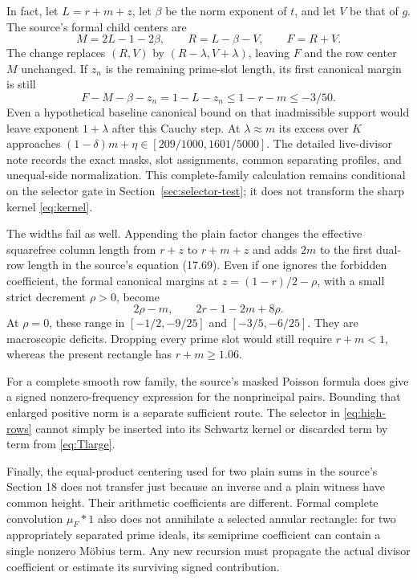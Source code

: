\documentclass[11pt]{article}
\theoremstyle{definition}
\theoremstyle{remark}
\numberwithin{equation}{section}
\begin{document}
In fact, let $L=r+m+z$, let $\beta$ be the norm exponent of $t$,
and let $V$ be that of $g$. The source's formal child centers are
\[
M=2L-1-2\beta,\qquad R=L-\beta-V,\qquad F=R+V.
\]
The change replaces $(R,V)$ by $(R-\lambda,V+\lambda)$, leaving
$F$ and the row center $M$ unchanged. If $z_n$ is the remaining
prime-slot length, its first canonical margin is still
\begin{equation}\label{eq:live-width}
F-M-\beta-z_n=1-L-z_n\le1-r-m\le-3/50.
\end{equation}
Even a hypothetical baseline canonical bound on that inadmissible
support would leave exponent $1+\lambda$ after this Cauchy step.
At $\lambda\approx m$ its excess over $K$ approaches
$(1-\delta)m+\eta\in[209/1000,1601/5000]$.
The detailed live-divisor note records the exact masks, slot assignments,
common separating profiles, and unequal-side normalization. This
complete-family calculation remains conditional on the selector gate
in Section~\ref{sec:selector-test}; it does not transform the sharp
kernel \eqref{eq:kernel}.

The widths fail as well. Appending the plain factor changes the
effective squarefree column length from $r+z$ to $r+m+z$ and adds
$2m$ to the first dual-row length in the source's equation (17.69).
Even if one ignores the forbidden coefficient, the formal canonical
margins at $z=(1-r)/2-\rho$, with a small strict decrement $\rho>0$,
become
\begin{equation}\label{eq:bad-widths}
2\rho-m,\qquad 2r-1-2m+8\rho.
\end{equation}
At $\rho=0$, these range in $[-1/2,-9/25]$ and
$[-3/5,-6/25]$. They are macroscopic deficits. Dropping every
prime slot would still require $r+m<1$, whereas the present rectangle
has $r+m\ge1.06$.

For a complete smooth row family, the source's masked Poisson
formula does give a signed nonzero-frequency expression for the
nonprincipal pairs. Bounding that enlarged positive norm is a
separate sufficient route. The selector in \eqref{eq:high-rows}
cannot simply be inserted into its Schwartz kernel or discarded
term by term from \eqref{eq:Tlarge}.

Finally, the equal-product centering used for two plain sums in
the source's Section 18 does not transfer just because an inverse
and a plain witness have common height. Their arithmetic coefficients
are different. Formal complete convolution $\mu_F*1$ also does not
annihilate a selected annular rectangle: for two appropriately
separated prime ideals, its semiprime coefficient can contain a
single nonzero M\"obius term. Any new recursion must propagate the
actual divisor coefficient or estimate its surviving signed
contribution.
\end{document}

